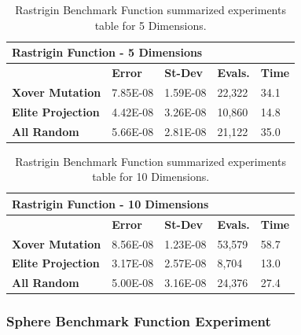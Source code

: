 \documentclass[graybox]{svmult}
\begin{document}
            \begin{table}[]
                \scriptsize
                \centering
                \caption{Rastrigin Benchmark Function summarized experiments table for 5 Dimensions.}\label{tab.fun_rastrigin5}
                \begin{tabular}{@{}lllll@{}}
                \toprule
                \multicolumn{5}{l}{\textbf{Rastrigin Function - 5 Dimensions}} \\ \midrule
                & \textbf{Error} & \textbf{St-Dev} & \textbf{Evals.} & \textbf{Time} \\
                \textbf{Xover Mutation} & 7.85E-08 & 1.59E-08 & 22,322 & 34.1 \\
                \textbf{Elite Projection} & 4.42E-08 & 3.26E-08 & 10,860 & 14.8 \\
                \textbf{All Random} & 5.66E-08 & 2.81E-08 & 21,122 & 35.0 \\ \bottomrule
                \end{tabular}
                \end{table}

            \begin{table}[]
                \scriptsize
                \centering
                \caption{Rastrigin Benchmark Function summarized experiments table for 10 Dimensions.}\label{tab.fun_rastrigin10}
                \begin{tabular}{@{}lllll@{}}
                \toprule
                \multicolumn{5}{l}{\textbf{Rastrigin Function - 10   Dimensions}} \\ \midrule
                & \textbf{Error} & \textbf{St-Dev} & \textbf{Evals.} & \textbf{Time} \\
                \textbf{Xover Mutation} & 8.56E-08 & 1.23E-08 & 53,579 & 58.7 \\
                \textbf{Elite Projection} & 3.17E-08 & 2.57E-08 & 8,704 & 13.0 \\
                \textbf{All Random} & 5.00E-08 & 3.16E-08 & 24,376 & 27.4 \\ \bottomrule
                \end{tabular}
                \end{table}
            
            \FloatBarrier


        \subsubsection{Sphere Benchmark Function Experiment}
\end{document}
